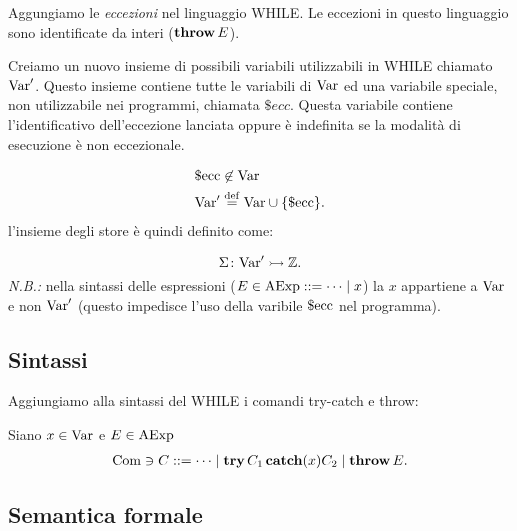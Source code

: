 Aggungiamo le \emph{eccezioni} nel linguaggio WHILE. Le eccezioni in
questo linguaggio sono identificate da interi ($\mathop{\textup{\textbf{throw}}} E$).

Creiamo un nuovo insieme di possibili variabili utilizzabili in WHILE
chiamato $\mathrm{Var}'$. Questo insieme contiene tutte le variabili di $\mathrm{Var}$
ed una variabile speciale, non utilizzabile nei programmi, chiamata
$\$ecc$. Questa variabile contiene l'identificativo dell'eccezione
lanciata oppure è indefinita se la modalità di esecuzione è non
eccezionale.

\begin{align*}
  &\ecc \not \in \Var \\
  &\Var' \defeq \Var \union \{\ecc\}.
\end{align*}
l'insieme degli store è quindi definito come:

\[
  \mathord{\Sigma}\colon\mathrm{Var}'\rightarrowtail\mathbb{Z}.
\]
\emph{N.B.:} nella sintassi delle espressioni ($E \in \AExp ::= \dots
\vbar x$) la $x$ appartiene a $\mathrm{Var}$ e non $\mathrm{Var}'$ (questo
impedisce l'uso della varibile $\mathrm{\$ecc}$ nel programma).

\subsection{Sintassi}
Aggiungiamo alla sintassi del WHILE i comandi try-catch e throw:

Siano $x \in \mathrm{Var}$ e $E \in \mathrm{AExp}$
\begin{align*}
\Com \ni C ::= \dots \vbar \kw{try} C_1 \kw{catch}(x) C_2\vbar \kw{throw} E.
\end{align*}

\subsection{Semantica formale}

